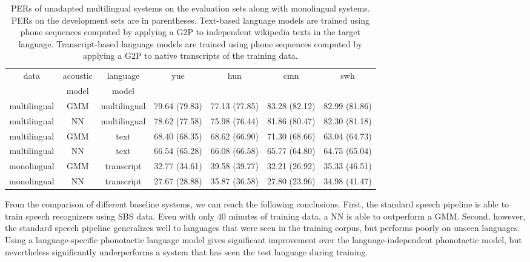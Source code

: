 \begin{table*}
\begin{center}
\begin{tabular}{|c|c|c|cccc|}
\hline
data & acoustic & language & yue & hun & cmn & swh \\
 & model & model &  & & & \\
\hline
multilingual & GMM & multilingual & 79.64 (79.83) & 77.13 (77.85) & 83.28 (82.12) & 82.99 (81.86) \\
multilingual & NN & multilingual & 78.62 (77.58) & 75.98 (76.44) & 81.86 (80.47) & 82.30 (81.18) \\
multilingual & GMM & text & 68.40 (68.35) & 68.62 (66.90) & 71.30 (68.66) & 63.04 (64.73) \\
multilingual & NN & text & 66.54 (65.28) & 66.08 (66.58) & 65.77 (64.80) & 64.75 (65.04) \\
\hline
monolingual & GMM & transcript & 32.77 (34.61) & 39.58 (39.77) & 32.21 (26.92) & 35.33 (46.51) \\
monolingual & NN & transcript & 27.67 (28.88) & 35.87 (36.58) & 27.80 (23.96) & 34.98 (41.47) \\
\hline
\end{tabular}
\caption{\label{tab:results} PERs of unadapted multilingual systems on
  the evaluation sets along with monolingual systems.  PERs on the
  development sets are in parentheses.  Text-based language models are
  trained using phone sequences computed by applying a G2P to
  independent wikipedia texts in the target language. Transcript-based
  language models are trained using phone sequences computed by
  applying a G2P to native transcripts of the training data.}
\end{center}
\end{table*}

From the comparison of different baseline systems, we can reach the
following conclusions.  First, the standard speech pipeline is able to
train speech recognizers using SBS data.  Even with only 40 minutes of
training data, a NN is able to outperform a GMM.  Second,
however, the standard speech pipeline generalizes well to languages
that were seen in the training corpus, but performs poorly on unseen
languages.  Using a language-specific phonotactic language model gives
significant improvement over the language-independent phonotactic
model, but nevertheless significantly underperforms a system that
has seen the test language during training.  

